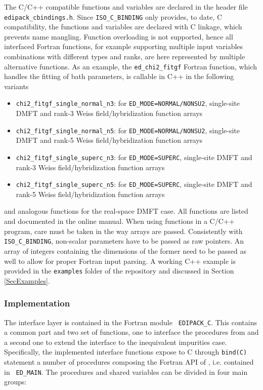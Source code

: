 \documentclass[edipack2.tex]{subfiles}
\begin{document}
The C/C++ compatible functions and variables 
are declared in the header file  {\tt edipack\_cbindings.h}.
Since {\tt ISO\_C\_BINDING} only provides, to date, C compatibility, the 
functions and variables are declared with C linkage, which prevents name mangling.
Function overloading is not supported, hence all interfaced Fortran functions,
for example supporting multiple input variables combinations with different types
and ranks, are here represented by multiple alternative functions.
As an example, the {\tt ed\_chi2\_fitgf} Fortran function, which handles the fitting of bath parameters, is callable in C++ in the following variants
\begin{itemize}
    \item  {\tt chi2\_fitgf\_single\_normal\_n3}: for {\tt ED\_MODE=NORMAL/NONSU2}, single-site DMFT and rank-3 Weiss field/hybridization function arrays
    \item  {\tt chi2\_fitgf\_single\_normal\_n5}: for {\tt ED\_MODE=NORMAL/NONSU2}, single-site DMFT and rank-5 Weiss field/hybridization function arrays
    \item  {\tt chi2\_fitgf\_single\_superc\_n3}: for {\tt ED\_MODE=SUPERC}, single-site DMFT and rank-3 Weiss field/hybridization function arrays
    \item  {\tt chi2\_fitgf\_single\_superc\_n5}: for {\tt ED\_MODE=SUPERC}, single-site DMFT and rank-5 Weiss field/hybridization function arrays
\end{itemize}
and analogous functions for the real-space DMFT case. All functions are listed and documented in the online manual.
When using \NAME functions in a C/C++ program, care must be taken in the way arrays are passed. Consistently with {\tt ISO\_C\_BINDING}, non-scalar parameters have to be passed as raw pointers. An array of integers containing the dimensions of the former need to be passed as well to allow for proper Fortran input parsing. A working C++ example is provided in the {\tt examples} folder of the \NAME repository and discussed in Section \ref{SecExamples}.

\subsubsection{Implementation}\label{sSecInteropCbindingsImplementation}
The interface layer is contained in the Fortran module {\tt
  EDIPACK\_C}. This contains a common part and two set of functions,
one to interface the procedures from \NAME and a second
one to extend the interface to the inequivalent impurities case.
Specifically, the implemented interface functions expose to C through
{\tt bind(C)} statement a number of
procedures composing the Fortran API of \NAME, i.e. contained in {\tt
  ED\_MAIN}. The procedures and shared variables can be divided in four main groups:
\end{document}
